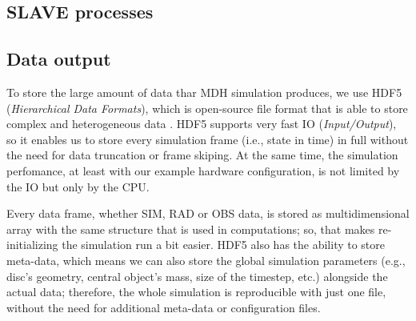 \subsection{SLAVE processes}
    
    \begin{figure}[H]
    \centering
    \end{figure}

\subsection{Data output}
    To store the large amount of data thar MDH simulation produces, we use HDF5 (\emph{Hierarchical Data Formats}), which is open-source file format that is able to store complex and heterogeneous data \citep{hdf5_2006}. HDF5 supports very fast IO (\emph{Input/Output}), so it enables us to store every simulation frame (i.e., state in time) in full without the need for data truncation or frame skiping. At the same time, the simulation perfomance, at least with our example hardware configuration, is not limited by the IO but only by the CPU. 

    Every data frame, whether SIM, RAD or OBS data, is stored as multidimensional array with the same structure that is used in computations; so, that makes re-initializing the simulation run a bit easier. HDF5 also has the ability to store meta-data, which means we can also store the global simulation parameters (e.g., disc's geometry, central object's mass, size of the timestep, etc.) alongside the actual data; therefore, the whole simulation is reproducible with just one file, without the need for additional meta-data or configuration files.

